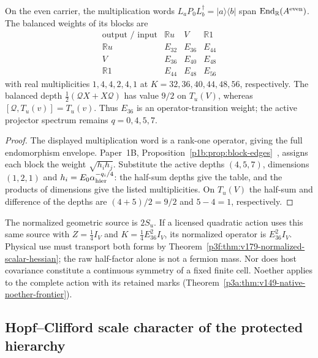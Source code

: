 \documentclass[12pt,a4paper]{article}
\begin{document}
\begin{corollary}
\label{p3c:cor:v179-complete-balanced-weights}
On the even carrier, the multiplication words
\(L_aP_0L_b^\dagger=|a\rangle\langle b|\) span
\(\operatorname{End}_{\mathbb R}(A^{\rm even})\).  The balanced weights of
its blocks are
\[
\begin{array}{c|ccc}
\text{output / input}&\mathbb Ru&V&\mathbb R1\\ \hline
\mathbb Ru&E_{32}&E_{36}&E_{44}\\
V&E_{36}&E_{40}&E_{48}\\
\mathbb R1&E_{44}&E_{48}&E_{56}
\end{array}
\]
with real multiplicities \(1,4,4,2,4,1\) at
\(K=32,36,40,44,48,56\), respectively.
The balanced depth \(\tfrac12(\mathcal QX+X\mathcal Q)\) has value \(9/2\)
on \(T_u(V)\), whereas \([\mathcal Q,T_u(v)]=T_u(v)\).
Thus \(E_{36}\) is an operator-transition weight; the active projector
spectrum remains \(q=0,4,5,7\).
\end{corollary}
\begin{proof}
The displayed multiplication word is a rank-one operator, giving the full
endomorphism envelope.  Paper~1B,
Proposition~\ref{p1b:prop:block-edges}~\cite{Kugelmann2026Paper1B},
assigns each block the weight \(\sqrt{h_ih_j}\).
Substitute the active depths \((4,5,7)\), dimensions \((1,2,1)\) and
\(h_i=E_0\alpha_{\rm hier}^{-q_i/4}\): the half-sum depths give the
table, and the products of dimensions give the listed multiplicities.
On \(T_u(V)\) the half-sum and difference of the depths are
\((4+5)/2=9/2\) and \(5-4=1\), respectively.
\end{proof}

The normalized geometric source is \(2S_u\).  If a licensed quadratic
action uses this same source with \(Z=\tfrac14I_V\) and
\(K=\tfrac14E_{36}^2I_V\), its normalized operator is \(E_{36}^2I_V\).
Physical use must transport both forms by
Theorem~\ref{p3f:thm:v179-normalized-scalar-hessian}; the raw half-factor
alone is not a fermion mass.  Nor does host covariance constitute a
continuous symmetry of a fixed finite cell.  Noether applies to the complete
action with its retained marks
(Theorem~\ref{p3a:thm:v149-native-noether-frontier}).

\subsection{Hopf--Clifford scale character of the protected hierarchy}
\label{p3c:sec:v222-hopf-clifford-character}
\end{document}
